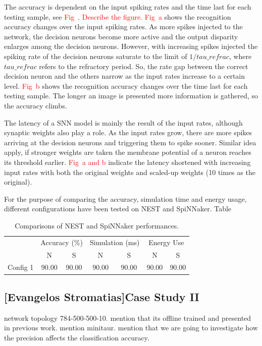 The accuracy is dependent on the input spiking rates and the time last for each testing sample, see \textcolor{red}{Fig~}.
\textcolor{red}{Describe the figure.}
\textcolor{red}{Fig~a} shows the recognition accuracy changes over the input spiking rates.
As more spikes injected to the network, the decision neurons become more active and the output disparity enlarges among the decision neurons.
However, with increasing spikes injected the spiking rate of the decision neurons saturate to the limit of $1/tau\_refrac$, where $tau\_refrac$ refers to the refractory period.  
So, the rate gap between the correct decision neuron and the others narrow as the input rates increase to a certain level.
\textcolor{red}{Fig~b} shows the recognition accuracy changes over the time last for each testing sample.
The longer an image is presented more information is gathered, so the accuracy climbs.

The latency of a SNN model is mainly the result of the input rates, although synaptic weights also play a role.
As the input rates grow, there are more spikes arriving at the decision neurons and triggering them to spike sooner.
Similar idea apply, if stronger weights are taken the membrane potential of a neuron reaches its threshold earlier.
\textcolor{red}{Fig~a and b} indicate the latency shortened with increasing input rates with both the original weights and scaled-up weights (10 times as the original).

For the purpose of comparing the accuracy, simulation time and energy usage, different configurations have been tested on NEST and SpiNNaker.
Table~

\begin{table}[h]
\caption{Comparisons of NEST and SpiNNaker performances.}
\begin{center}
\begin{tabular} {c|c|c|c|c|c|c}
	 &\multicolumn{2}{c|}{Accuracy (\%)}  &\multicolumn{2}{c|}{Simulation (ms)}
	 &\multicolumn{2}{c}{Energy Use}   \\
	 \cline{2-7}
	& N & S & N & S & N & S\\
    \hline
    Config 1 & 90.00 & 90.00 & 90.00 & 90.00 & 90.00 & 90.00 \\

\end{tabular}
\label{tbl:compare}
\end{center}
\end{table}


\subsection{[Evangelos Stromatias]Case Study II}
network topology 784-500-500-10. mention that its offline trained and presented in previous work. mention minitaur. mention that we are going to investigate how the precision affects the classification accuracy.

